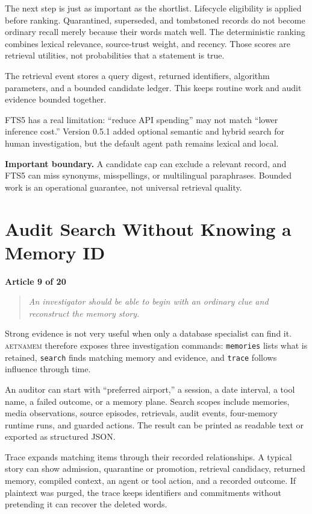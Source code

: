 \documentclass[11pt]{article}
\newcommand{\system}{\textsc{aetnamem}}
\newcommand{\articlelabel}[1]{%
  \noindent\colorbox{aetnaTeal!10}{%
    \parbox{0.96\textwidth}{\color{aetnaInk}\small\textbf{Article #1 of 20}}}%
  \par\medskip}
\newcommand{\coreidea}[1]{%
  \begin{quote}\color{aetnaTeal}\large\itshape #1\end{quote}}
\newcommand{\boundary}[1]{%
  \par\smallskip\noindent\textbf{Important boundary.} #1}
\begin{document}
The next step is just as important as the shortlist. Lifecycle eligibility is
applied before ranking. Quarantined, superseded, and tombstoned records do not
become ordinary recall merely because their words match well. The deterministic
ranking combines lexical relevance, source-trust weight, and recency. Those
scores are retrieval utilities, not probabilities that a statement is true.

The retrieval event stores a query digest, returned identifiers, algorithm
parameters, and a bounded candidate ledger. This keeps routine work and audit
evidence bounded together.

FTS5 has a real limitation: ``reduce API spending'' may not match ``lower
inference cost.'' Version 0.5.1 added optional semantic and hybrid search for
human investigation, but the default agent path remains lexical and local.

\boundary{A candidate cap can exclude a relevant record, and FTS5 can miss
synonyms, misspellings, or multilingual paraphrases. Bounded work is an
operational guarantee, not universal retrieval quality.}

\clearpage
\section{Audit Search Without Knowing a Memory ID}
\articlelabel{9}
\coreidea{An investigator should be able to begin with an ordinary clue and
reconstruct the memory story.}

Strong evidence is not very useful when only a database specialist can find
it. \system{} therefore exposes three investigation commands:
\texttt{memories} lists what is retained, \texttt{search} finds matching
memory and evidence, and \texttt{trace} follows influence through time.

An auditor can start with ``preferred airport,'' a session, a date interval,
a tool name, a failed outcome, or a memory plane. Search scopes include
memories, media observations, source episodes, retrievals, audit events,
four-memory runtime runs, and guarded actions. The result can be printed as
readable text or exported as structured JSON.

Trace expands matching items through their recorded relationships. A typical
story can show admission, quarantine or promotion, retrieval candidacy,
returned memory, compiled context, an agent or tool action, and a recorded
outcome. If plaintext was purged, the trace keeps identifiers and commitments
without pretending it can recover the deleted words.
\end{document}
